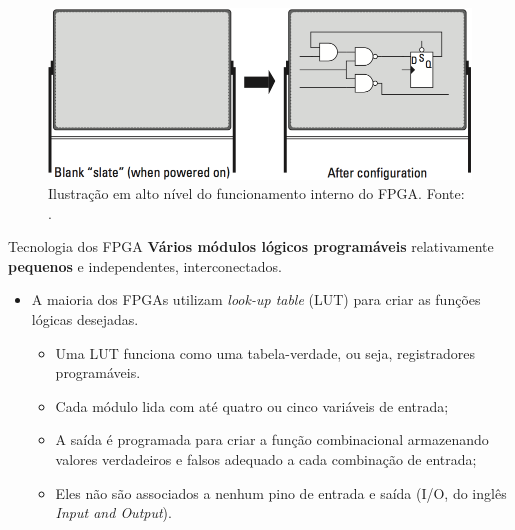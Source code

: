    \begin{frame}
      \begin{figure}[h] \centering
         \includegraphics[width=1\textwidth]{img/rt-board.png}
         \caption{Ilustração em alto nível do funcionamento interno do FPGA. Fonte: \cite{Sass2010}.}
      \end{figure}
   \end{frame}

   \begin{frame}{Tecnologia dos FPGA} \vspace{-1em}
      \textbf{Vários módulos lógicos programáveis} relativamente \textbf{pequenos} e independentes, interconectados.
      
      \begin{itemize}
         \item A maioria dos FPGAs utilizam \textit{look-up table} (LUT) para criar as funções lógicas desejadas.
         \begin{itemize} 
            \setlength{\itemsep}{1.5em}
            \item Uma LUT funciona como uma tabela-verdade, ou seja, registradores programáveis. 
            \item Cada módulo lida com até quatro ou cinco variáveis de entrada;
            \item A saída é programada para criar a função combinacional armazenando valores verdadeiros e falsos adequado a cada combinação de entrada;
            \item Eles não são associados a nenhum pino de entrada e saída (I/O, do inglês \textit{Input and Output}). 
         \end{itemize}
      
      \end{itemize}
   \end{frame}
   
